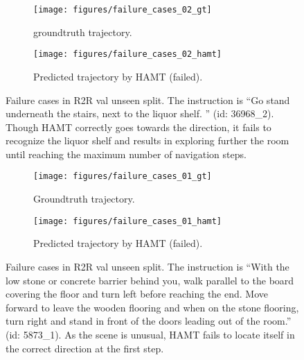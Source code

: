 \begin{figure}
	\centering
	\begin{subfigure}[b]{0.48\textwidth}
		\centering
		\texttt{[image: figures/failure\_cases\_02\_gt]}
		\caption{groundtruth trajectory.}
		\label{fig:fail_02_gt}
	\end{subfigure}
	\hfill
	\begin{subfigure}[b]{0.48\textwidth}
		\centering
		\texttt{[image: figures/failure\_cases\_02\_hamt]}
		\caption{Predicted trajectory by HAMT (failed).}
		\label{fig:fail_02_hamt}
	\end{subfigure}
	\caption{Failure cases in R2R val unseen split. The instruction is ``Go stand underneath the stairs, next to the liquor shelf. '' (id: 36968\_2). Though HAMT correctly goes towards the direction, it fails to recognize the liquor shelf and results in exploring further the room until reaching the maximum number of navigation steps.}
	\label{fig:fail_02}
\end{figure}

\begin{figure}
	\centering
	\begin{subfigure}[b]{0.48\textwidth}
		\centering
		\texttt{[image: figures/failure\_cases\_01\_gt]}
		\caption{Groundtruth trajectory.}
		\label{fig:fail_01_gt}
	\end{subfigure}
	\hfill
	\begin{subfigure}[b]{0.48\textwidth}
		\centering
		\texttt{[image: figures/failure\_cases\_01\_hamt]}
		\caption{Predicted trajectory by HAMT (failed).}
		\label{fig:fail_01_hamt}
	\end{subfigure}
	\caption{Failure cases in R2R val unseen split. The instruction is ``With the low stone or concrete barrier behind you, walk parallel to the board covering the floor and turn left before reaching the end. Move forward to leave the wooden flooring and when on the stone flooring, turn right and stand in front of the doors leading out of the room.'' (id: 5873\_1). As the scene is unusual, HAMT fails to locate itself in the correct direction at the first step.}
	\label{fig:fail_01}
\end{figure}

